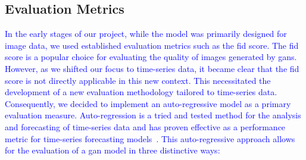 \subsection{Evaluation Metrics}
\textcolor{blue}{
In the early stages of our project, while the model was primarily designed for image data, we used established evaluation metrics such as the \gls*{fid} score. The \gls{fid} score is a popular choice for evaluating the quality of images generated by \glspl*{gan}. However, as we shifted our focus to time-series data, it became clear that the \gls{fid} score is not directly applicable in this new context. This necessitated the development of a new evaluation methodology tailored to time-series data.
\\
Consequently, we decided to implement an auto-regressive model as a primary evaluation measure. Auto-regression is a tried and tested method for the analysis and forecasting of time-series data and has proven effective as a performance metric for time-series forecasting models~\cite{rnntimeseries}. This auto-regressive approach allows for the evaluation of a \gls*{gan} model in three distinctive ways:}




